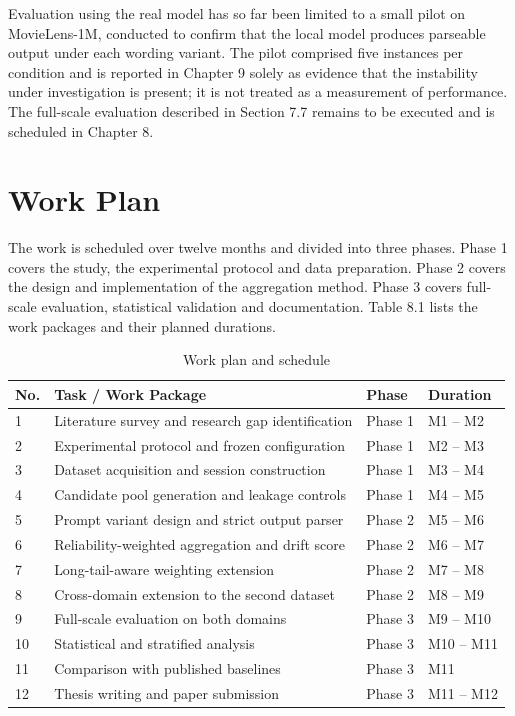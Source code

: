 \documentclass[12pt,a4paper,oneside]{report}
\begin{document}
Evaluation using the real model has so far been limited to a small pilot on
MovieLens-1M, conducted to confirm that the local model produces parseable output
under each wording variant. The pilot comprised five instances per condition and
is reported in Chapter 9 solely as evidence that the instability under
investigation is present; it is not treated as a measurement of performance. The
full-scale evaluation described in Section 7.7 remains to be executed and is
scheduled in Chapter 8.

\chapter{Work Plan}

The work is scheduled over twelve months and divided into three phases. Phase 1
covers the study, the experimental protocol and data preparation. Phase 2 covers
the design and implementation of the aggregation method. Phase 3 covers
full-scale evaluation, statistical validation and documentation. Table 8.1 lists
the work packages and their planned durations.

\begin{table}[h]
\centering
\small
\caption{Work plan and schedule}
\begin{tabularx}{\textwidth}{@{}p{0.6cm}Xp{1.8cm}p{2.0cm}@{}}
\toprule
\textbf{No.} & \textbf{Task / Work Package} & \textbf{Phase} & \textbf{Duration}\\
\midrule
1 & Literature survey and research gap identification & Phase 1 & M1 -- M2\\
2 & Experimental protocol and frozen configuration & Phase 1 & M2 -- M3\\
3 & Dataset acquisition and session construction & Phase 1 & M3 -- M4\\
4 & Candidate pool generation and leakage controls & Phase 1 & M4 -- M5\\
5 & Prompt variant design and strict output parser & Phase 2 & M5 -- M6\\
6 & Reliability-weighted aggregation and drift score & Phase 2 & M6 -- M7\\
7 & Long-tail-aware weighting extension & Phase 2 & M7 -- M8\\
8 & Cross-domain extension to the second dataset & Phase 2 & M8 -- M9\\
9 & Full-scale evaluation on both domains & Phase 3 & M9 -- M10\\
10 & Statistical and stratified analysis & Phase 3 & M10 -- M11\\
11 & Comparison with published baselines & Phase 3 & M11\\
12 & Thesis writing and paper submission & Phase 3 & M11 -- M12\\
\bottomrule
\end{tabularx}
\end{table}
\end{document}
